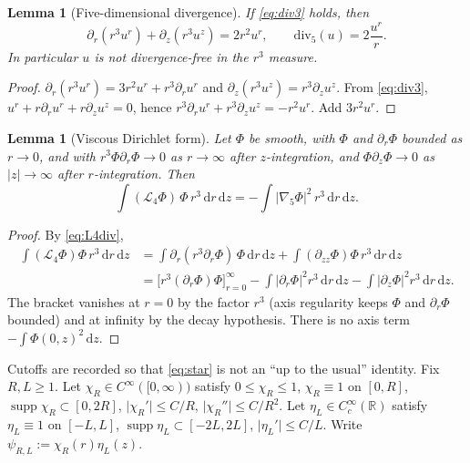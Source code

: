\documentclass[11pt]{article}
\newtheorem{lemma}[theorem]{Lemma}
\theoremstyle{definition}
\newcommand{\R}{\mathbb{R}}
\newcommand{\dd}{\mathrm{d}}
\newcommand{\ur}{u^{r}}
\newcommand{\uz}{u^{z}}
\newcommand{\Ph}{\Phi}
\newcommand{\Lfour}{\mathcal{L}_{4}}
\newcommand{\gradfive}{\nabla_{5}}
\newcommand{\divfive}{\mathrm{div}_{5}}
\newcommand{\abs}[1]{\lvert#1\rvert}
\begin{document}
\begin{lemma}[Five-dimensional divergence]
\label{lem:div5}
If \eqref{eq:div3} holds, then
\begin{equation}
  \label{eq:div5}
  \partial_r(r^3\ur)+\partial_z(r^3\uz)=2r^2\ur,
  \qquad
  \divfive(u)=2\frac{\ur}{r}.
\end{equation}
In particular \(u\) is not divergence-free in the \(r^3\) measure.
\end{lemma}

\begin{proof}
\(\partial_r(r^3\ur)=3r^2\ur+r^3\partial_r\ur\) and
\(\partial_z(r^3\uz)=r^3\partial_z\uz\).
From \eqref{eq:div3},
\(\ur+r\partial_r\ur+r\partial_z\uz=0\), hence
\(r^3\partial_r\ur+r^3\partial_z\uz=-r^2\ur\).
Add \(3r^2\ur\).
\end{proof}

\begin{lemma}[Viscous Dirichlet form]
\label{lem:visc}
Let \(\Ph\) be smooth, with \(\Ph\) and \(\partial_r\Ph\) bounded as
\(r\to 0\), and with
\(r^3\Ph\partial_r\Ph\to 0\) as \(r\to\infty\) after \(z\)-integration,
and \(\Ph\partial_z\Ph\to 0\) as \(\abs{z}\to\infty\) after \(r\)-integration.
Then
\begin{equation}
  \label{eq:visc}
  \int(\Lfour\Ph)\,\Ph\,r^3\,\dd r\,\dd z
  =-\int\abs{\gradfive\Ph}^2\,r^3\,\dd r\,\dd z.
\end{equation}
\end{lemma}

\begin{proof}
By \eqref{eq:L4div},
\begin{align*}
\int(\Lfour\Ph)\Ph\,r^3\,\dd r\,\dd z
&=\int\partial_r(r^3\partial_r\Ph)\,\Ph\,\dd r\,\dd z
+\int(\partial_{zz}\Ph)\Ph\,r^3\,\dd r\,\dd z\\
&=\bigl[r^3(\partial_r\Ph)\Ph\bigr]_{r=0}^{\infty}
-\int\abs{\partial_r\Ph}^2 r^3\,\dd r\,\dd z
-\int\abs{\partial_z\Ph}^2 r^3\,\dd r\,\dd z.
\end{align*}
The bracket vanishes at \(r=0\) by the factor \(r^3\)
(axis regularity keeps \(\Ph\) and \(\partial_r\Ph\) bounded)
and at infinity by the decay hypothesis. There is no axis term
\(-\int\Ph(0,z)^2\,\dd z\).
\end{proof}

Cutoffs are recorded so that \eqref{eq:star} is not an ``up to the usual''
identity. Fix \(R,L\ge 1\). Let \(\chi_R\in C^\infty([0,\infty))\) satisfy
\(0\le\chi_R\le 1\), \(\chi_R\equiv 1\) on \([0,R]\),
\(\operatorname{supp}\chi_R\subset[0,2R]\),
\(\abs{\chi_R'}\le C/R\), \(\abs{\chi_R''}\le C/R^2\).
Let \(\eta_L\in C_c^\infty(\R)\) satisfy \(\eta_L\equiv 1\) on \([-L,L]\),
\(\operatorname{supp}\eta_L\subset[-2L,2L]\),
\(\abs{\eta_L'}\le C/L\). Write \(\psi_{R,L}:=\chi_R(r)\eta_L(z)\).
\end{document}
